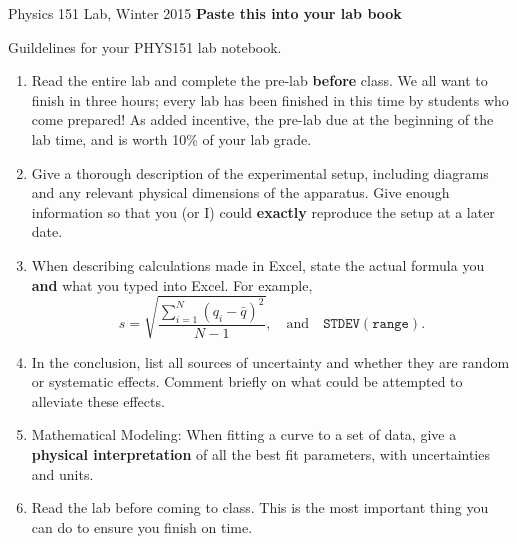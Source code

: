 \documentclass[12pt]{article}
\begin{document}
\begin{center}
Physics 151 Lab, Winter 2015 \hfill 
{\bf Paste this into your lab book}

\vspace{1cm}

{\Large Guildelines for your PHYS151 lab notebook.}
\end{center}

\vspace{1cm}

\begin{enumerate}
\item Read the entire lab and complete the pre-lab {\bf before} class. We all want to finish in three hours; every lab has been finished in this time by students who come prepared! As added incentive, the pre-lab due at the beginning of the lab time, and is worth 10\% of your lab grade.

\item Give a thorough description of the experimental setup, including diagrams and any relevant physical dimensions of the apparatus. Give enough information so that you (or I) could {\bf exactly} reproduce the setup at a later date.

\item When describing calculations made in Excel, state the actual formula you {\bf and} what you typed into Excel. For example,
\begin{equation*}
  s = \sqrt{ \frac{\sum_{i=1}^N(q_i-\bar{q})^2}{N-1}},
  \quad \text{and} \quad \mathtt{STDEV(range)}.
\end{equation*}

\item In the conclusion, list all sources of uncertainty and whether they are random or systematic effects. Comment briefly on what could be attempted to alleviate these effects.

\item Mathematical Modeling: When fitting a curve to a set of data, give a {\bf physical interpretation} of all the best fit parameters, with uncertainties and units.

\item Read the lab before coming to class. This is the most important thing you can do to ensure you finish on time.

\end{enumerate}

\vspace{1cm}
\end{document}
